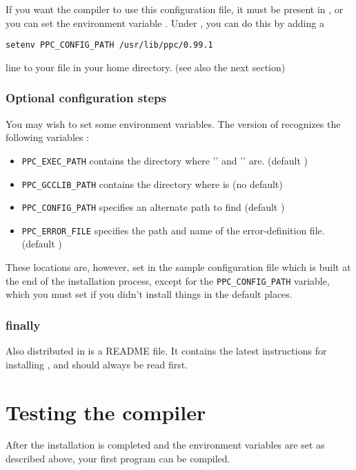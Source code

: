 \documentclass{report}
\begin{document}
If you want the \fpc compiler to use this configuration file, it must be
present in , or you can set the environment variable
. Under , you can do this by adding  a 
\begin{verbatim}
setenv PPC_CONFIG_PATH /usr/lib/ppc/0.99.1
\end{verbatim}
line to your  file in your home directory. 
(see also the next section) 

\subsubsection{Optional configuration steps}
You may wish to set some environment variables. The \linux version of \fpc
recognizes the following variables :
\begin{itemize}
\item \verb|PPC_EXEC_PATH| contains the directory where '' and
'' are. (default )
\item \verb|PPC_GCCLIB_PATH| contains the directory where  is (no default)
\item \verb|PPC_CONFIG_PATH| specifies an alternate path to find
 (default )
\item \verb|PPC_ERROR_FILE|  specifies the path and name of the error-definition file. 
                  (default )
\end{itemize}

These locations are, however, set in the sample configuration file which is 
built at the end of the installation process, except for the
\verb|PPC_CONFIG_PATH| variable, which you must set if you didn't install
things in the default places.
\subsubsection{finally}
Also distributed in \fpc is a README file. It contains the latest
instructions for installing \fpc, and should always be read first.


\section{Testing the compiler}
After the installation is completed and the environment variables are
set as described above, your first program can be compiled. 
\end{document}
